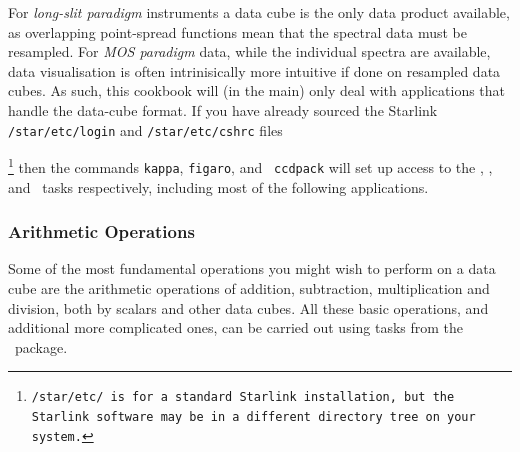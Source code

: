 \documentclass[twoside,11pt]{article}
\begin{document}
For {\em long-slit paradigm} instruments a data cube is the only data
product available, as overlapping point-spread functions mean that the
spectral data must be resampled.  For {\em MOS paradigm} data, while
the individual spectra are available, data visualisation is often
intrinisically more intuitive if done on resampled data cubes.  As
such, this cookbook will (in the main) only deal with applications
that handle the data-cube format.  If you have already sourced the
Starlink {\tt /star/etc/login} and {\tt /star/etc/cshrc} 
files{\footnote {\tt /star/etc/ is for a standard Starlink installation,
but the Starlink software may be in a different directory tree on your
system.} then the commands {\tt kappa}, {\tt figaro}, and {\tt
ccdpack} will set up access to the \KAPPAref, \FIGAROref, and
\CCDPACKref\ tasks respectively, including most of the following
applications.

\subsubsection{Arithmetic Operations}

Some of the most fundamental operations you might wish to perform on a
data cube are the arithmetic operations of addition, subtraction,
multiplication and division, both by scalars and other data cubes.  All
these basic operations, and additional more complicated ones, can be
carried out using tasks from the \KAPPAref\ package.

\begin{itemize}


\end{itemize}}
\end{document}
